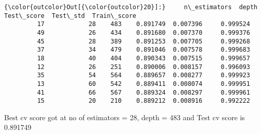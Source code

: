 \documentclass[11pt]{article}
\begin{document}
\begin{Verbatim}[commandchars=\\\{\}]
{\color{outcolor}Out[{\color{outcolor}20}]:}     n\_estimators  depth  Test\_score  Test\_std  Train\_score
         17            28    483    0.891749  0.007396     0.999524
         49            26    434    0.891680  0.007370     0.999376
         45            28    389    0.891253  0.007705     0.999268
         37            34    479    0.891046  0.007578     0.999683
         18            40    404    0.890343  0.007515     0.999657
         12            26    251    0.890006  0.008157     0.996093
         35            54    564    0.889657  0.008277     0.999923
         13            60    542    0.889411  0.008074     0.999951
         41            66    567    0.889324  0.008297     0.999961
         15            20    210    0.889212  0.008916     0.992222
\end{Verbatim}
            
    Best cv score got at no of estimators = 28, depth = 483 and Test cv
score is 0.891749
\end{document}
